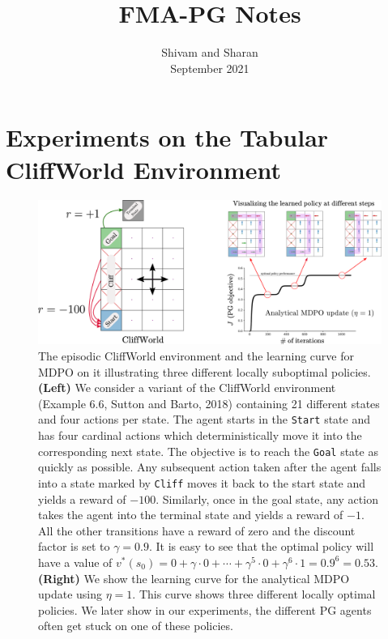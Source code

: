 \documentclass[a4paper, 10pt]{article}
\author{Shivam and Sharan
  \\ September 2021}
\date{}
\title{FMA-PG Notes}
\begin{document}
\maketitle
\vspace{-2cm}


\section{Experiments on the Tabular CliffWorld Environment}

  \begin{figure}[!hbp]
    \centering
    \includegraphics[scale=0.33]{tabular_figures/cliffworld.pdf}
    \caption{The episodic CliffWorld environment and the learning curve for MDPO on it illustrating three different locally suboptimal policies. \textbf{(Left)} We consider a variant of the CliffWorld environment (Example 6.6, Sutton and Barto, 2018) containing 21 different states and four actions per state. The agent starts in the \texttt{Start} state and has four cardinal actions which deterministically move it into the corresponding next state. The objective is to reach the \texttt{Goal} state as quickly as possible. Any subsequent action taken after the agent falls into a state marked by \texttt{Cliff} moves it back to the start state and yields a reward of $-100$. Similarly, once in the goal state, any action takes the agent into the terminal state and yields a reward of $-1$. All the other transitions have a reward of zero and the discount factor is set to $\gamma = 0.9$. It is easy to see that the optimal policy will have a value of $v^*(s_0) = 0 + \gamma \cdot 0 + \cdots + \gamma^5 \cdot 0 + \gamma^6 \cdot 1 = 0.9^6 = 0.53$. \textbf{(Right)} We show the learning curve for the analytical MDPO update using $\eta = 1$. This curve shows three different locally optimal policies. We later show in our experiments, the different PG agents often get stuck on one of these policies.}
    \label{fig: cliffworld}
  \end{figure}
\end{document}
